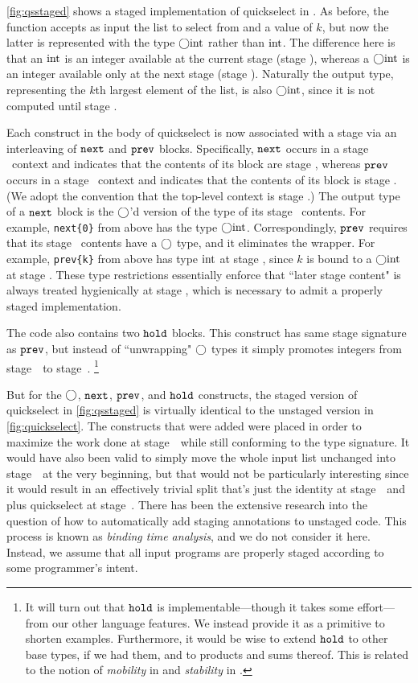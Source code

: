\ref{fig:qsstaged} shows a staged implementation of quickselect in \lang.
As before, the function accepts as input the list to select from and a value of $k$,
but now the latter is represented with the type $\bigcirc{\rm int}$ rather than ${\rm int}$.
The difference here is that an ${\rm int}$ is an integer available at the current stage (stage \bbone), 
whereas a $\bigcirc{\rm int}$ is an integer available only at the next stage (stage \bbtwo).
Naturally the output type, representing the $k$th largest element of the list,
is also $\bigcirc{\rm int}$, since it is not computed until stage \bbtwo.

Each construct in the body of quickselect is now associated with a stage via an interleaving of ${\tt next}$ and ${\tt prev}$ blocks.  
Specifically, ${\tt next}$ occurs in a stage \bbone\ context and indicates that the contents of its block are stage \bbtwo, 
whereas ${\tt prev}$ occurs in a stage \bbtwo\ context and indicates that the contents of its block is stage \bbone.
(We adopt the convention that the top-level context is stage \bbone.)
The output type of a ${\tt next}$ block is the $\bigcirc$'d version of the type of its stage \bbtwo\ contents.  
For example, \verb|next{0}| from above has the type $\bigcirc{\rm int}$.
Correspondingly, ${\tt prev}$ requires that its stage \bbone\ contents have a $\bigcirc$ type, and it eliminates the wrapper.
For example, \verb|prev{k}| from above has type ${\rm int}$ at stage \bbtwo, since $k$ is bound to a $\bigcirc{\rm int}$ at stage \bbone.
These type restrictions essentially enforce that ``later stage content" is always treated hygienically at stage \bbone,
which is necessary to admit a properly staged implementation.

The code also contains two ${\tt hold}$ blocks.  
This construct has same stage signature as ${\tt prev}$,
but instead of ``unwrapping" $\bigcirc$ types it simply promotes integers from stage~\bbone\ to stage~\bbtwo.
\footnote{It will turn out that ${\tt hold}$ is implementable---though it takes some effort---from our other language features.
We instead provide it as a primitive to shorten examples.  
Furthermore, it would be wise to extend ${\tt hold}$ to other base types, if we had them, and to products and sums thereof.
This is related to the notion of {\em mobility} in \cite{murphy05} and {\em stability} in \cite{krishnaswami13}.}

But for the $\bigcirc$, ${\tt next}$, ${\tt prev}$, and ${\tt hold}$ constructs, 
the staged version of quickselect in \ref{fig:qsstaged} is virtually identical to the unstaged version in \ref{fig:quickselect}.
The constructs that were added were placed in order to maximize the work done at stage~\bbone\ while still conforming to the type signature.
It would have also been valid to simply move the whole input list unchanged into stage~\bbtwo\ at the very beginning, 
but that would not be particularly interesting since it would result in an effectively trivial split 
that's just the identity at stage~\bbone\ and plus quickselect at stage~\bbtwo.
There has been the extensive research into the question of how to automatically add staging annotations to unstaged code.
This process is known as {\em binding time analysis}, and we do not consider it here.
Instead, we assume that all input programs are properly staged according to some programmer's intent.

